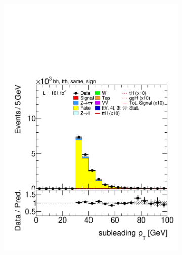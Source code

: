 \begin{figure}[htbp]
    \begin{subfigure}[b]{0.45\textwidth}
      \centering
      \includegraphics[width=\textwidth]{images/fakes_run3/plot_tau_1_pt_hh_tth_22_23_24_same_sign.pdf}
      \caption{}
    \end{subfigure}
    \hfill
    \begin{subfigure}[b]{0.45\textwidth}
      \centering

\end{subfigure}
\end{figure}
